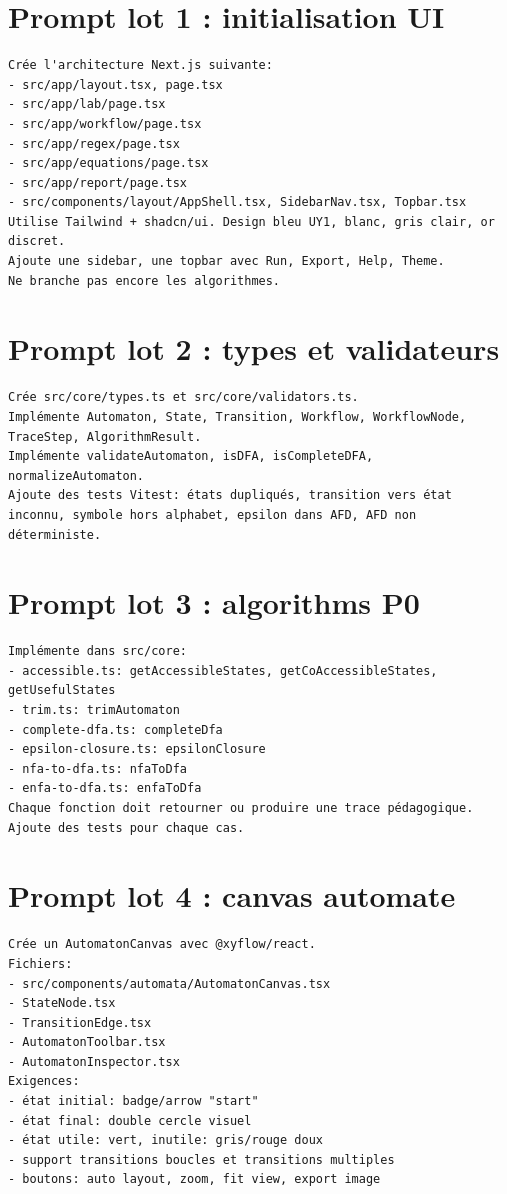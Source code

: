 \documentclass[11pt,a4paper]{report}
\begin{document}
\section{Prompt lot 1 : initialisation UI}
\begin{lstlisting}
Crée l'architecture Next.js suivante:
- src/app/layout.tsx, page.tsx
- src/app/lab/page.tsx
- src/app/workflow/page.tsx
- src/app/regex/page.tsx
- src/app/equations/page.tsx
- src/app/report/page.tsx
- src/components/layout/AppShell.tsx, SidebarNav.tsx, Topbar.tsx
Utilise Tailwind + shadcn/ui. Design bleu UY1, blanc, gris clair, or discret.
Ajoute une sidebar, une topbar avec Run, Export, Help, Theme.
Ne branche pas encore les algorithmes.
\end{lstlisting}

\section{Prompt lot 2 : types et validateurs}
\begin{lstlisting}
Crée src/core/types.ts et src/core/validators.ts.
Implémente Automaton, State, Transition, Workflow, WorkflowNode, TraceStep, AlgorithmResult.
Implémente validateAutomaton, isDFA, isCompleteDFA, normalizeAutomaton.
Ajoute des tests Vitest: états dupliqués, transition vers état inconnu, symbole hors alphabet, epsilon dans AFD, AFD non déterministe.
\end{lstlisting}

\section{Prompt lot 3 : algorithms P0}
\begin{lstlisting}
Implémente dans src/core:
- accessible.ts: getAccessibleStates, getCoAccessibleStates, getUsefulStates
- trim.ts: trimAutomaton
- complete-dfa.ts: completeDfa
- epsilon-closure.ts: epsilonClosure
- nfa-to-dfa.ts: nfaToDfa
- enfa-to-dfa.ts: enfaToDfa
Chaque fonction doit retourner ou produire une trace pédagogique.
Ajoute des tests pour chaque cas.
\end{lstlisting}

\section{Prompt lot 4 : canvas automate}
\begin{lstlisting}
Crée un AutomatonCanvas avec @xyflow/react.
Fichiers:
- src/components/automata/AutomatonCanvas.tsx
- StateNode.tsx
- TransitionEdge.tsx
- AutomatonToolbar.tsx
- AutomatonInspector.tsx
Exigences:
- état initial: badge/arrow "start"
- état final: double cercle visuel
- état utile: vert, inutile: gris/rouge doux
- support transitions boucles et transitions multiples
- boutons: auto layout, zoom, fit view, export image
\end{lstlisting}
\end{document}

